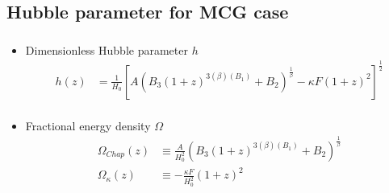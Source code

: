 \documentclass[8pt,hideothersubsections]{beamer}
\newcommand{\brac}[1]{\left(#1\right)}
\newcommand{\bracc}[1]{\left[#1\right]}
\begin{document}
\subsection{Hubble parameter for MCG case}
\begin{frame}
\frametitle{\insertsectionhead}
\framesubtitle{\insertsubsectionhead}
\fontsize{8pt}{7.2}\selectfont
\begin{itemize}
\item Dimensionless Hubble parameter $h$
\begin{equation}\label{eq:zChDimHubbleParm}
\begin{split}
h(z) &= \frac{1}{H_{0}}\bracc{A\brac{B_{3}\brac{1+z}^{3\brac{\beta}\brac{B_{1}}}+B_{2}}^{\frac{1}{\beta}} -\kappa F\brac{1+z}^{2}}^{\frac{1}{2}}\\
\end{split}
\end{equation}
\item Fractional energy density $\Omega$
\begin{equation}\label{eq:ChFracEnDen}
\begin{split}
\Omega_{Chap}(z) &\equiv \frac{A}{H_{0}^{2}}\brac{B_{3}\brac{1+z}^{3\brac{\beta}\brac{B_{1}}}+B_{2}}^{\frac{1}{\beta}} \\
\Omega_{\kappa}(z)&\equiv -\frac{\kappa F}{H_{0}^{2}}\brac{1+z}^{2}\\
\end{split}
\end{equation}
\end{itemize}


\end{frame}
\end{document}
